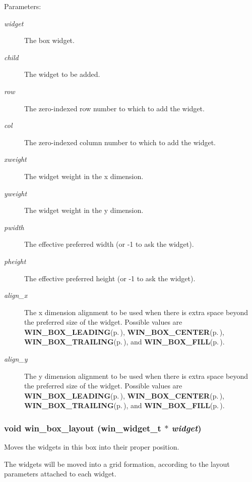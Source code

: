 \begin{Desc}
\item[Parameters:]
\begin{description}
\item[{\em widget}]The box widget. \item[{\em child}]The widget to be added. \item[{\em row}]The zero-indexed row number to which to add the widget. \item[{\em col}]The zero-indexed column number to which to add the widget. \item[{\em xweight}]The widget weight in the x dimension. \item[{\em yweight}]The widget weight in the y dimension. \item[{\em pwidth}]The effective preferred width (or -1 to ask the widget). \item[{\em pheight}]The effective preferred height (or -1 to ask the widget). \item[{\em align\_\-x}]The x dimension alignment to be used when there is extra space beyond the preferred size of the widget. Possible values are {\bf WIN\_\-BOX\_\-LEADING}{\rm (p.\,\pageref{winbox_8h_a0})}, {\bf WIN\_\-BOX\_\-CENTER}{\rm (p.\,\pageref{winbox_8h_a1})}, {\bf WIN\_\-BOX\_\-TRAILING}{\rm (p.\,\pageref{winbox_8h_a2})}, and {\bf WIN\_\-BOX\_\-FILL}{\rm (p.\,\pageref{winbox_8h_a3})}. \item[{\em align\_\-y}]The y dimension alignment to be used when there is extra space beyond the preferred size of the widget. Possible values are {\bf WIN\_\-BOX\_\-LEADING}{\rm (p.\,\pageref{winbox_8h_a0})}, {\bf WIN\_\-BOX\_\-CENTER}{\rm (p.\,\pageref{winbox_8h_a1})}, {\bf WIN\_\-BOX\_\-TRAILING}{\rm (p.\,\pageref{winbox_8h_a2})}, and {\bf WIN\_\-BOX\_\-FILL}{\rm (p.\,\pageref{winbox_8h_a3})}. \end{description}
\end{Desc}
\subsubsection{\setlength{\rightskip}{0pt plus 5cm}void win\_\-box\_\-layout ({\bf win\_\-widget\_\-t} $\ast$ {\em widget})}\label{winbox_8h_a10}


Moves the widgets in this box into their proper position. 

The widgets will be moved into a grid formation, according to the layout parameters attached to each widget. 

